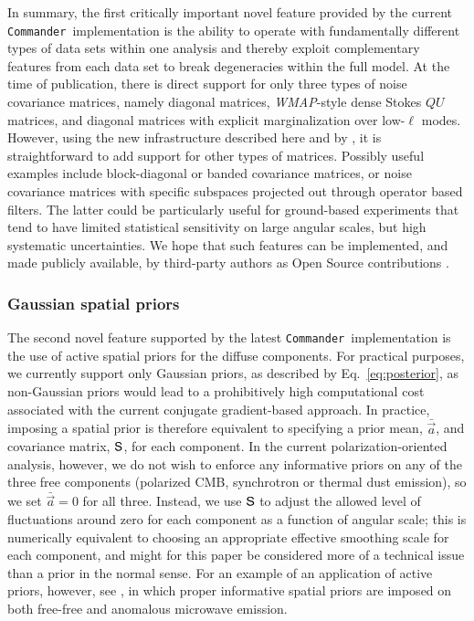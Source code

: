 \documentclass[twocolumn]{aa}
\def\WMAP{\textit{WMAP}}
\def\commander{\texttt{Commander}}
\renewcommand{\a}[0]{\vec{a}}
\renewcommand{\S}[0]{\tens{S}}
\newcommand{\?}[1]{\textcolor{red}{{\bf [#1]}}}
\begin{document}
In summary, the first critically important novel feature provided by
the current \commander\ implementation is the ability to operate with
fundamentally different types of data sets within one analysis and
thereby exploit complementary features from each data set to break
degeneracies within the full model. At the time of publication, there
is direct support for only three types of noise covariance matrices,
namely diagonal matrices, \WMAP-style dense Stokes $QU$ matrices, and
diagonal matrices with explicit marginalization over low-$\ell$
modes. However, using the new infrastructure described here and by
\citet{bp03}, it is straightforward to add support for other types of
matrices. Possibly useful examples include block-diagonal or banded
covariance matrices, or noise covariance matrices with specific
subspaces projected out through operator based filters. The latter
could be particularly useful for ground-based experiments that tend to
have limited statistical sensitivity on large angular scales, but high
systematic uncertainties. We hope that such features can be
implemented, and made publicly available, by third-party authors as
Open Source contributions \citep{bp05}.

\subsubsection{Gaussian spatial priors}
\label{sec:priors}

The second novel feature supported by the latest \commander\ implementation is
the use of active spatial priors for the diffuse components. For practical
purposes, we currently support only Gaussian priors, as described by
Eq.~\eqref{eq:posterior}, as non-Gaussian priors would lead to a prohibitively
high computational cost associated with the current conjugate gradient-based approach. In
practice, imposing a spatial prior is therefore equivalent to specifying a prior
mean, $\bar{\a}$, and covariance matrix, $\S$, for each component. In the current
polarization-oriented analysis, however, we do not wish to enforce any
informative priors on any of the three free components
(polarized CMB, synchrotron or thermal dust emission), so we set
$\bar{\a}=0$ for all three. Instead, we use $\S$ to adjust the allowed
level of fluctuations around zero for each component as a function of angular
scale; this is numerically equivalent to choosing an appropriate effective
smoothing scale for each component, and might for this paper be considered more of a technical
issue than a prior in the normal sense. For an example of an application of
active priors, however, see \citet{bp13}, in which proper informative spatial
priors are imposed on both free-free and anomalous microwave emission.
\end{document}
